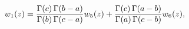 \[w_{1}(z)=\frac{\mathop{\Gamma\/}\nolimits\!\left(c\right)\mathop{\Gamma\/}%
\nolimits\!\left(b-a\right)}{\mathop{\Gamma\/}\nolimits\!\left(b\right)\mathop%
{\Gamma\/}\nolimits\!\left(c-a\right)}w_{5}(z)+\frac{\mathop{\Gamma\/}%
\nolimits\!\left(c\right)\mathop{\Gamma\/}\nolimits\!\left(a-b\right)}{\mathop%
{\Gamma\/}\nolimits\!\left(a\right)\mathop{\Gamma\/}\nolimits\!\left(c-b\right%
)}w_{6}(z),\]